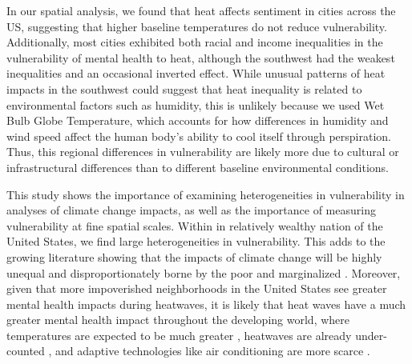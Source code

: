 \documentclass[fleqn,10pt]{wlscirep}
\begin{document}
In our spatial analysis, we found that heat affects sentiment in cities across the US, suggesting that higher baseline temperatures do not reduce vulnerability.   Additionally, most cities exhibited both racial and income inequalities in the vulnerability of mental health to heat, although the southwest had the weakest inequalities and an occasional inverted effect.  While unusual patterns of heat impacts in the southwest could suggest that heat inequality is related to environmental factors such as humidity, this is unlikely because we used Wet Bulb Globe Temperature, which accounts for how differences in humidity and wind speed affect the human body's ability to cool itself through perspiration.  Thus, this regional differences in vulnerability are likely more due to cultural or infrastructural differences than to different baseline environmental conditions.

This study shows the importance of examining heterogeneities in vulnerability in analyses of climate change impacts, as well as the importance of measuring vulnerability at fine spatial scales.  Within in relatively wealthy nation of the United States, we find large heterogeneities in vulnerability.  This adds to the growing literature showing that the impacts of climate change will be highly unequal and disproportionately borne by the poor and marginalized \cite{Thomas2019Mar}.  Moreover, given that more impoverished neighborhoods in the United States see greater mental health impacts during heatwaves, it is likely that heat waves have a much greater mental health impact throughout the developing world, where temperatures are expected to be much greater \cite{Raymond2020May}, heatwaves are already under-counted \cite{Harrington2020Sep}, and adaptive technologies like air conditioning are more scarce \cite{Biardeau2020Jan}.
\end{document}
